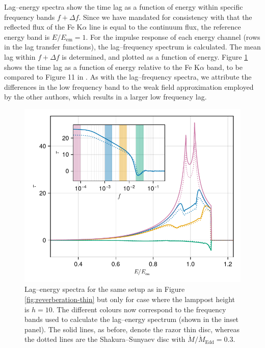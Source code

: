 \documentclass[fleqn,usenatbib]{mnras}
\newcommand{\FeKa}{Fe K$\alpha$ }
\begin{document}
Lag--energy spectra show the time lag as a function of energy within specific frequency bands $f + \Delta
f$. Since we have mandated for consistency with \cite{cackett_modelling_2014}
that the reflected flux of the \FeKa line is equal to the continuum flux,
the reference energy band is $E/E_\text{em} = 1$.  For the impulse response of
each energy channel (rows in the lag transfer functions), the lag--frequency
spectrum is calculated. The mean lag within $f + \Delta f$ is determined, and
plotted as a function of energy. Figure \ref{fig:lag-energy} shows
the time lag as a function of energy relative to the \FeKa band,
to be compared to Figure 11 in \cite{cackett_modelling_2014}. As with the
lag--frequency spectra, we attribute the differences in the low frequency band to
the weak field approximation employed by the other authors, which results in a
larger low frequency lag.

\begin{figure}
    \centering
    \includegraphics[width=0.98\columnwidth]{figures/reverberation.lag-energy.pdf}
    \caption{Lag--energy spectra for the same setup as in Figure
    \ref{fig:reverberation-thin} but only for case where the lamppost height is
    $h=10$. The different colours now correspond to the frequency bands used to
    calculate the lag--energy spectrum (shown in the inset panel). The solid lines,
    as before, denote the razor thin disc, whereas the dotted lines are the
    Shakura--Sunyaev disc with $\dot{M} / \dot{M}_\text{Edd} =0.3$.}
    \label{fig:lag-energy}
\end{figure}
\end{document}

